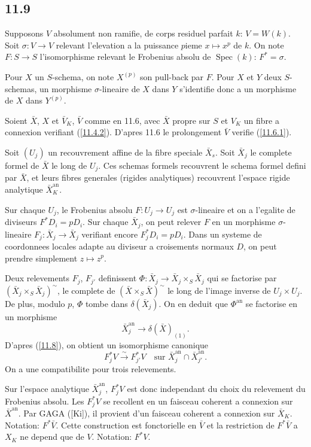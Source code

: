 \documentclass[12pt,a4paper]{article}
\theoremstyle{plain}
\theoremstyle{definition}
\theoremstyle{remark}
\DeclareMathOperator{\Spec}{Spec}
\newcommand{\an}{\mathrm{an}}
\begin{document}
\subsection*{11.9}

Supposons $V$ absolument non ramifie, de corps residuel parfait $k$: $V = W(k)$. Soit $\sigma: V \to V$ relevant l'elevation a la puissance $p$ieme $x \mapsto x^p$ de $k$. On note $F: S \to S$ l'isomorphisme relevant le Frobenius absolu de $\Spec(k)$: $F^* = \sigma$.

Pour $X$ un $S$-schema, on note $X^{(p)}$ son pull-back par $F$. Pour $X$ et $Y$ deux $S$-schemas, un morphisme $\sigma$-lineaire de $X$ dans $Y$ s'identifie donc a un morphisme de $X$ dans $Y^{(p)}$.

Soient $\bar{X}$, $X$ et $\bar{V}_K$, $\bar{V}$ comme en 11.6, avec $\bar{X}$ propre sur $S$ et $V_K$ un fibre a connexion verifiant (\ref{11.4.2}). D'apres 11.6 le prolongement $\bar{V}$ verifie (\ref{11.6.1}).

Soit $(U_j)$ un recouvrement affine de la fibre speciale $\bar{X}_s$. Soit $\bar{X}_j$ le complete formel de $\bar{X}$ le long de $U_j$. Ces schemas formels recouvrent le schema formel defini par $\bar{X}$, et leurs fibres generales (rigides analytiques) recouvrent l'espace rigide analytique $\bar{X}_K^{\an}$.

Sur chaque $U_j$, le Frobenius absolu $F: U_j \to U_j$ est $\sigma$-lineaire et on a l'egalite de diviseurs $F^* D_i = p D_i$. Sur chaque $\bar{X}_j$, on peut relever $F$ en un morphisme $\sigma$-lineaire $F_j: \bar{X}_j \to \bar{X}_j$ verifiant encore $F_j^* D_i = p D_i$. Dans un systeme de coordonnees locales adapte au diviseur a croisements normaux $D$, on peut prendre simplement $z \mapsto z^p$.

Deux relevements $F_j$, $F_{j'}$ definissent $\Phi: \bar{X}_j \to \bar{X}_j \times_S \bar{X}_j$ qui se factorise par $(\bar{X}_j \times_S \bar{X}_j)^\sim$, le complete de $(\bar{X} \times_S \bar{X})^\sim$ le long de l'image inverse de $U_j \times U_j$. De plus, modulo $p$, $\Phi$ tombe dans $\delta(\bar{X}_j)$. On en deduit que $\Phi^{\an}$ se factorise en un morphisme
$$\bar{X}_j^{\an} \longrightarrow \delta(\bar{X})_{(1)}.$$
D'apres (\ref{11.8}), on obtient un isomorphisme canonique
$$F_j^* V \xrightarrow{\sim} F_{j'}^* V \quad \text{sur } \bar{X}_j^{\an} \cap \bar{X}_{j'}^{\an}.$$
On a une compatibilite pour trois relevements.

Sur l'espace analytique $\bar{X}_j^{\an}$, $F_j^* V$ est donc independant du choix du relevement du Frobenius absolu. Les $F_j^* V$ se recollent en un faisceau coherent a connexion sur $\bar{X}^{\an}$. Par GAGA ([Ki]), il provient d'un faisceau coherent a connexion sur $\bar{X}_K$. Notation: $F^* \bar{V}$. Cette construction est fonctorielle en $\bar{V}$ et la restriction de $F^* \bar{V}$ a $X_K$ ne depend que de $V$. Notation: $F^* V$.
\end{document}
